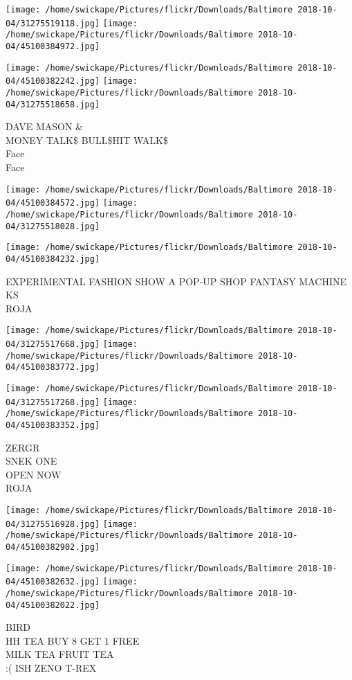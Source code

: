 \documentclass[10pt,letterpaper]{article}
\begin{document}
\texttt{[image: /home/swickape/Pictures/flickr/Downloads/Baltimore 2018-10-04/31275519118.jpg]}
\texttt{[image: /home/swickape/Pictures/flickr/Downloads/Baltimore 2018-10-04/45100384972.jpg]}

\texttt{[image: /home/swickape/Pictures/flickr/Downloads/Baltimore 2018-10-04/45100382242.jpg]}
\texttt{[image: /home/swickape/Pictures/flickr/Downloads/Baltimore 2018-10-04/31275518658.jpg]}

DAVE MASON \&\\
MONEY TALK\$ BULL\$HIT WALK\$\\
Face\\
Face
\pagebreak

\texttt{[image: /home/swickape/Pictures/flickr/Downloads/Baltimore 2018-10-04/45100384572.jpg]}
\texttt{[image: /home/swickape/Pictures/flickr/Downloads/Baltimore 2018-10-04/31275518028.jpg]}

\vspace{0.25in}
\texttt{[image: /home/swickape/Pictures/flickr/Downloads/Baltimore 2018-10-04/45100384232.jpg]}

EXPERIMENTAL FASHION SHOW A POP{-}UP SHOP FANTASY MACHINE\\
KS\\
ROJA
\pagebreak

\texttt{[image: /home/swickape/Pictures/flickr/Downloads/Baltimore 2018-10-04/31275517668.jpg]}
\texttt{[image: /home/swickape/Pictures/flickr/Downloads/Baltimore 2018-10-04/45100383772.jpg]}

\texttt{[image: /home/swickape/Pictures/flickr/Downloads/Baltimore 2018-10-04/31275517268.jpg]}
\texttt{[image: /home/swickape/Pictures/flickr/Downloads/Baltimore 2018-10-04/45100383352.jpg]}

ZERGR\\
SNEK ONE\\
OPEN NOW\\
ROJA
\pagebreak

\texttt{[image: /home/swickape/Pictures/flickr/Downloads/Baltimore 2018-10-04/31275516928.jpg]}
\texttt{[image: /home/swickape/Pictures/flickr/Downloads/Baltimore 2018-10-04/45100382902.jpg]}

\texttt{[image: /home/swickape/Pictures/flickr/Downloads/Baltimore 2018-10-04/45100382632.jpg]}
\texttt{[image: /home/swickape/Pictures/flickr/Downloads/Baltimore 2018-10-04/45100382022.jpg]}

BIRD\\
HH TEA BUY 8 GET 1 FREE\\
MILK TEA FRUIT TEA\\
:( ISH ZENO T{-}REX
\pagebreak
\end{document}
